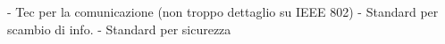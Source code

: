 - Tec per la comunicazione (non troppo dettaglio su IEEE 802)
- Standard per scambio di info.
- Standard per sicurezza